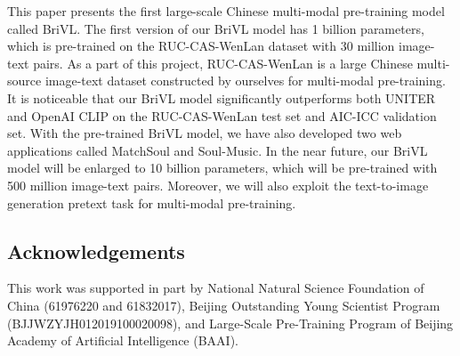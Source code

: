\documentclass[10pt,twocolumn,letterpaper]{article}
\begin{document}
This paper presents the first large-scale Chinese multi-modal pre-training model called BriVL. The first version of our BriVL model has 1 billion parameters, which is pre-trained on the RUC-CAS-WenLan dataset with 30 million image-text pairs. As a part of this project, RUC-CAS-WenLan is a large Chinese multi-source image-text dataset constructed by ourselves for multi-modal pre-training. It is noticeable that our BriVL model significantly outperforms both UNITER and OpenAI CLIP on the RUC-CAS-WenLan test set and AIC-ICC validation set. With the pre-trained BriVL model, we have also developed two web applications called MatchSoul and Soul-Music. In the near future, our BriVL model will be enlarged to 10 billion parameters, which will be pre-trained with 500 million image-text pairs. Moreover, we will also exploit the text-to-image generation pretext task for multi-modal pre-training.

\subsection*{Acknowledgements}

This work was supported in part by National Natural Science Foundation of China (61976220 and 61832017), Beijing Outstanding Young Scientist Program (BJJWZYJH012019100020098), and Large-Scale Pre-Training Program of Beijing Academy of Artificial Intelligence (BAAI).

{

}
\end{document}
